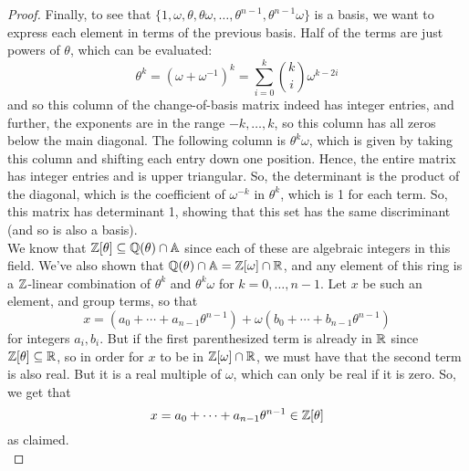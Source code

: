 \begin{proof}
    Finally, to see that $\{1,\omega,\theta,\theta\omega,\ldots,\theta^{n-1},\theta^{n-1}\omega\}$ is a basis, we want to express each element in terms of the previous basis. Half of the terms are just powers of $\theta$, which can be evaluated:
    \[ \theta^k = (\omega+\omega^{-1})^k = \sum_{i=0}^k {k \choose i}\omega^{k-2i} \]
    and so this column of the change-of-basis matrix indeed has integer entries, and further, the exponents are in the range $-k,\ldots,k$, so this column has all zeros below the main diagonal. The following column is $\theta^k\omega$, which is given by taking this column and shifting each entry down one position. Hence, the entire matrix has integer entries and is upper triangular. So, the determinant is the product of the diagonal, which is the coefficient of $\omega^{-k}$ in $\theta^k$, which is 1 for each term. So, this matrix has determinant 1, showing that this set has the same discriminant (and so is also a basis). \\

    We know that $\mathbb{Z}[\theta] \subseteq \mathbb{Q}(\theta) \cap \mathbb{A}$ since each of these are algebraic integers in this field. We've also shown that $\mathbb{Q}(\theta) \cap \mathbb{A} = \mathbb{Z}[\omega] \cap \mathbb{R}$, and any element of this ring is a $\mathbb{Z}$-linear combination of $\theta^k$ and $\theta^k\omega$ for $k=0,\ldots,n-1$. Let $x$ be such an element, and group terms, so that
    \[ x = (a_0+\cdots+a_{n-1}\theta^{n-1}) + \omega(b_0+\cdots+b_{n-1}\theta^{n-1}) \]
    for integers $a_i,b_i$. But if the first parenthesized term is already in $\mathbb{R}$ since $\mathbb{Z}[\theta] \subseteq \mathbb{R}$, so in order for $x$ to be in $\mathbb{Z}[\omega] \cap \mathbb{R}$, we must have that the second term is also real. But it is a real multiple of $\omega$, which can only be real if it is zero. So, we get that
    \[ x = a_0+\cdots+a_{n-1}\theta^{n-1} \in \mathbb{Z}[\theta] \]
    as claimed. \\


\end{proof}
